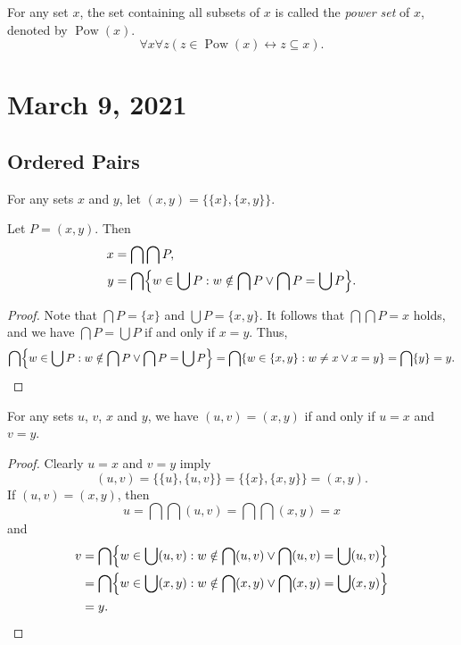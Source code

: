 \documentclass[11pt]{article}
\DeclareMathOperator{\pow}{Pow}
\begin{document}
\begin{definition}
  For any set $x$, the set containing all subsets of $x$ is called the \emph{power set} of $x$, denoted by $\pow(x)$.
  \begin{equation*}
    \forall x \forall z (z \in \pow(x) \leftrightarrow z \subseteq x).
  \end{equation*}
\end{definition}

\section{March 9, 2021}
\subsection{Ordered Pairs}
\begin{definition}
  For any sets $x$ and $y$, let $(x, y) = \{\{x\}, \{x, y\}\}$.
\end{definition}

\begin{theorem}
  Let $P = (x, y)$.
  Then
  \begin{align*}
    x &= \bigcap \bigcap P, \\
    y &= \bigcap \Bigl\{w \in \bigcup P: w \notin \bigcap P \vee \bigcap P = \bigcup P\Bigr\}.
  \end{align*}
\end{theorem}
\begin{proof}
  Note that $\bigcap P = \{x\}$ and $\bigcup P = \{x, y\}$.
  It follows that $\bigcap \bigcap P = x$ holds, and we have $\bigcap P = \bigcup P$ if and only if $x = y$.
  Thus,
  \begin{equation*}
    \bigcap \Bigl\{w \in \bigcup P: w \notin \bigcap P \vee \bigcap P = \bigcup P\Bigr\}
    = \bigcap \{w \in \{x, y\}: w \neq x \vee x = y\}
    = \bigcap \{y\}
    = y.
    \qedhere
  \end{equation*}
\end{proof}

\begin{corollary}
  For any sets $u$, $v$, $x$ and $y$, we have $(u, v) = (x, y)$ if and only if $u = x$ and $v = y$.
\end{corollary}
\begin{proof}
  Clearly $u = x$ and $v = y$ imply
  \begin{equation*}
    (u, v)
    = \{\{u\}, \{u, v\}\}
    = \{\{x\}, \{x, y\}\}
    = (x, y).
  \end{equation*}
  If $(u, v) = (x, y)$, then
  \begin{equation*}
    u = \bigcap \bigcap (u, v) = \bigcap \bigcap (x, y) = x
  \end{equation*}
  and
  \begin{align*}
    v
    &= \bigcap \Bigl\{w \in \bigcup (u, v): w \notin \bigcap (u, v) \vee \bigcap (u, v) = \bigcup (u, v)\Bigr\} \\
    &= \bigcap \Bigl\{w \in \bigcup (x, y): w \notin \bigcap (x, y) \vee \bigcap (x, y) = \bigcup (x, y)\Bigr\} \\
    &= y.
    \qedhere
  \end{align*}
\end{proof}
\end{document}
